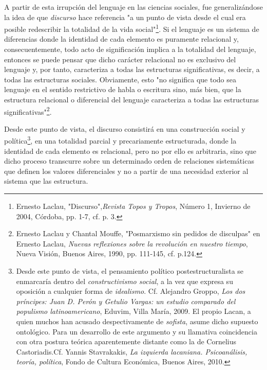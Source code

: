 \documentclass{book}
\begin{document}
A partir de esta irrupción del lenguaje en las ciencias sociales, fue
generalizándose la idea de que \emph{discurso} hace referencia "a un
punto de vista desde el cual era posible redescribir la totalidad de la
vida social"\footnote{Ernesto Laclau, "Discurso",\emph{Revista Topos y
  Tropos}, Número 1, Invierno de 2004, Córdoba, pp. 1-7, cf. p. 3.}. Si
el lenguaje es un sistema de diferencias donde la identidad de cada
elemento es puramente relacional y, consecuentemente, todo acto de
significación implica a la totalidad del lenguaje, entonces se puede
pensar que dicho carácter relacional no es exclusivo del lenguaje y, por
tanto, caracteriza a todas las estructuras significativas, es decir, a
todas las estructuras sociales. Obviamente, esto "no significa que todo
sea lenguaje en el sentido restrictivo de habla o escritura sino, más
bien, que la estructura relacional o diferencial del lenguaje
caracteriza a todas las estructuras significativas"\footnote{Ernesto
  Laclau y Chantal Mouffe, "Posmarxismo sin pedidos de disculpas" en
  Ernesto Laclau, \emph{Nuevas reflexiones sobre la revolución en
  nuestro tiempo}, Nueva Visión, Buenos Aires, 1990, pp. 111-145, cf.
  p.124.}.

Desde este punto de vista, el discurso consistirá en una construcción
social y política\footnote{Desde este punto de vista, el pensamiento
  político postestructuralista se enmarcaría dentro del
  \emph{constructivismo social}, a la vez que expresa su oposición a
  cualquier forma de \emph{idealismo}. Cf. Alejandro Groppo, \emph{Los
  dos príncipes: Juan D. Perón y Getulio Vargas: un estudio comparado
  del populismo latinoamericano}, Eduvim, Villa María, 2009. El propio
  Lacan, a quien muchos han acusado despectivamente de \emph{sofista},
  asume dicho supuesto ontológico. Para un desarrollo de este argumento
  y su llamativa coincidencia con otra postura teórica aparentemente
  distante como la de Cornelius Castoriadis.Cf. Yannis Stavrakakis,
  \emph{La izquierda lacaniana. Psicoanálisis, teoría, política}, Fondo
  de Cultura Económica, Buenos Aires, 2010.}, en una totalidad parcial y
precariamente estructurada, donde la identidad de cada elemento es
relacional, pero no por ello es arbitraria, sino que dicho proceso
transcurre sobre un determinado orden de relaciones sistemáticas que
definen los valores diferenciales y no a partir de una necesidad
exterior al sistema que las estructura.
\end{document}
